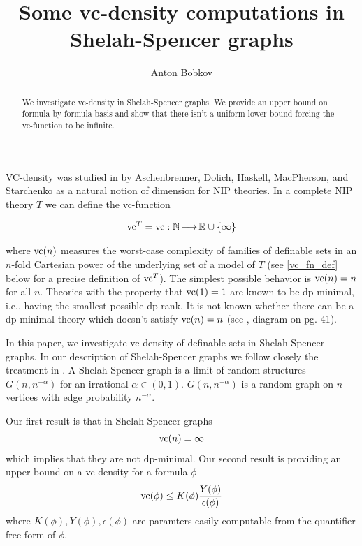 \documentclass{amsart}
\title{Some vc-density computations in Shelah-Spencer graphs}
\author{Anton Bobkov}
\newcommand{\curly}[1]{\left\{#1\right\}}
\begin{document}
\begin{abstract}
  We investigate vc-density in Shelah-Spencer graphs.
  We provide an upper bound on formula-by-formula basis and show that there isn't a uniform lower bound forcing the vc-function to be infinite.
\end{abstract}

\maketitle


VC-density was studied in \cite{density} by Aschenbrenner, Dolich, Haskell, MacPherson, and Starchenko as a natural notion of dimension for NIP theories.
In a complete NIP theory $T$ we can define the vc-function

\begin{align*}
  \vc^T = \vc : \N \arr \R \cup \curly{\infty}
\end{align*}

where $\operatorname{vc}(n)$ measures the worst-case complexity of families of definable sets in an $n$-fold Cartesian power of the underlying set of a model of $T$
(see \ref{vc_fn_def} below for a precise definition of $\operatorname{vc}^T$).
The simplest possible behavior is $\operatorname{vc}(n) = n$ for all $n$. Theories with the property that $\operatorname{vc}(1) = 1$ are known to be dp-minimal, i.e., having the smallest possible dp-rank. It is not known whether there can be a dp-minimal theory which doesn't satisfy $\operatorname{vc}(n)=n$
(see \cite{density}, diagram on pg. 41).

In this paper, we investigate vc-density of definable sets in Shelah-Spencer graphs.
In our description of Shelah-Spencer graphs we follow closely the treatment in \cite{laskowski}.
A Shelah-Spencer graph is a limit of random structures $G(n, n^{-\alpha})$ for an irrational $\alpha \in (0,1)$.
$G(n, n^{-\alpha})$ is a random graph on $n$ vertices with edge probability $n^{-\alpha}$.

Our first result is that in Shelah-Spencer graphs
\begin{align*}
    \operatorname{vc}(n) = \infty
\end{align*}
which implies that they are not dp-minimal.
Our second result is providing an upper bound on a vc-density for a formula $\phi$
\begin{align*}
    \operatorname{vc}(\phi) \leq K(\phi) \frac{Y(\phi)}{\epsilon(\phi)}    
\end{align*}
where $K(\phi), Y(\phi), \epsilon(\phi)$ are paramters easily computable from the quantifier free form of $\phi$.
\end{document}
